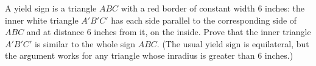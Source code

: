 A yield sign is a triangle $ABC$ with a red border of constant width $6$ inches: the inner white triangle $A'B'C'$ has each side parallel to the corresponding side of $ABC$ and at distance $6$ inches from it, on the inside. Prove that the inner triangle $A'B'C'$ is similar to the whole sign $ABC$. (The usual yield sign is equilateral, but the argument works for any triangle whose inradius is greater than $6$ inches.)
